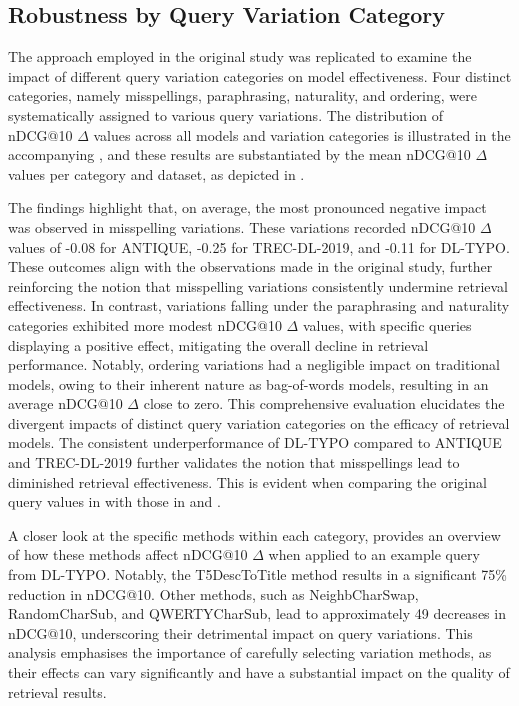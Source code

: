 \subsection{Robustness by Query Variation Category}
The approach employed in the original study was replicated to examine the impact of different query variation categories on model effectiveness. Four distinct categories, namely misspellings, paraphrasing, naturality, and ordering, were systematically assigned to various query variations. The distribution of nDCG@10 $\Delta$ values across all models and variation categories is illustrated in the accompanying , and these results are substantiated by the mean nDCG@10 $\Delta$ values per category and dataset, as depicted in .




The findings highlight that, on average, the most pronounced negative impact was observed in misspelling variations. These variations recorded nDCG@10 $\Delta$ values of -0.08 for ANTIQUE, -0.25 for TREC-DL-2019, and -0.11 for DL-TYPO. These outcomes align with the observations made in the original study, further reinforcing the notion that misspelling variations consistently undermine retrieval effectiveness. In contrast, variations falling under the paraphrasing and naturality categories exhibited more modest nDCG@10 $\Delta$ values, with specific queries displaying a positive effect, mitigating the overall decline in retrieval performance. Notably, ordering variations had a negligible impact on traditional models, owing to their inherent nature as bag-of-words models, resulting in an average nDCG@10 $\Delta$ close to zero. This comprehensive evaluation elucidates the divergent impacts of distinct query variation categories on the efficacy of retrieval models. The consistent underperformance of DL-TYPO compared to ANTIQUE and TREC-DL-2019 further validates the notion that misspellings lead to diminished retrieval effectiveness. This is evident when comparing the original query values in  with those in  and .

A closer look at the specific methods within each category,  provides an overview of how these methods affect nDCG@10 $\Delta$ when applied to an example query from DL-TYPO. Notably, the T5DescToTitle method results in a significant 75\% reduction in nDCG@10. Other methods, such as NeighbCharSwap, RandomCharSub, and QWERTYCharSub, lead to approximately 49 decreases in nDCG@10, underscoring their detrimental impact on query variations. This analysis emphasises the importance of carefully selecting variation methods, as their effects can vary significantly and have a substantial impact on the quality of retrieval results.

